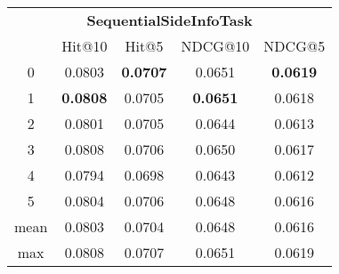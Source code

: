 \documentclass{article}
\begin{document}
 

\begin{tabular}{c|cccc}

\multicolumn{5}{c}{\textbf{SequentialSideInfoTask}} \\
\noalign{\smallskip}
\noalign{\smallskip}
\toprule
\multicolumn{1}{c}{Template ID} & \multicolumn{1}{|c}{Hit@10} & \multicolumn{1}{c}{Hit@5} & \multicolumn{1}{c}{NDCG@10} & \multicolumn{1}{c}{NDCG@5} \\
\midrule
0 & 0.0803 & \textbf{0.0707} & 0.0651 & \textbf{0.0619} \\
1 & \textbf{0.0808} & 0.0705 & \textbf{0.0651} & 0.0618 \\
2 & 0.0801 & 0.0705 & 0.0644 & 0.0613 \\
3 & 0.0808 & 0.0706 & 0.0650 & 0.0617 \\
4 & 0.0794 & 0.0698 & 0.0643 & 0.0612 \\
5 & 0.0804 & 0.0706 & 0.0648 & 0.0616 \\
\midrule
mean & 0.0803 & 0.0704 & 0.0648 & 0.0616 \\
max & 0.0808 & 0.0707 & 0.0651 & 0.0619 \\
\bottomrule

\end{tabular}
\end{document}
